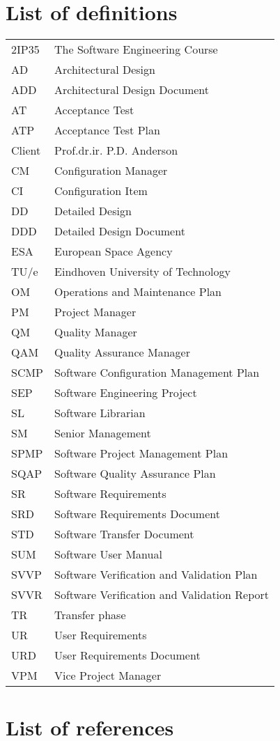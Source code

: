 \section{List of definitions}
\begin{tabular}{l|l}
2IP35 & The Software Engineering Course \\ 
AD    &Architectural Design \\ 
ADD   &Architectural Design Document \\ 
AT    &Acceptance Test \\ 
ATP   &Acceptance Test Plan \\ 
Client &Prof.dr.ir. P.D. Anderson \\ 
CM    &Configuration Manager \\ 
CI &Configuration Item\\
DD    &Detailed Design \\ 
DDD   &Detailed Design Document \\ 
ESA   &European Space Agency \\ 
TU/e  &Eindhoven University of Technology \\ 
OM    &Operations and Maintenance Plan \\ 
PM    &Project Manager \\ 
QM    &Quality Manager \\ 
QAM &Quality Assurance Manager\\
SCMP  &Software Configuration Management Plan \\ 
SEP   &Software Engineering Project \\ 
SL    &Software Librarian \\ 
SM	  &Senior Management \\
SPMP  &Software Project Management Plan \\ 
SQAP  &Software Quality Assurance Plan \\ 
SR    &Software Requirements \\ 
SRD   &Software Requirements Document \\ 
STD   &Software Transfer Document \\ 
SUM   &Software User Manual \\ 
SVVP  &Software Verification and Validation Plan \\ 
SVVR  &Software Verification and Validation Report \\ 
TR    &Transfer phase \\ 
UR    &User Requirements \\ 
URD   &User Requirements Document \\ 
VPM   &Vice Project Manager \\ 
\end{tabular}
\section{List of references}



